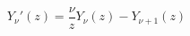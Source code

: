 \documentclass[12pt]{article}
\begin{document}
\begin{displaymath}
Y_\nu'(z) = \frac{\nu}{z}Y_\nu(z) - Y_{\nu+1}(z)
\end{displaymath}
\end{document}
